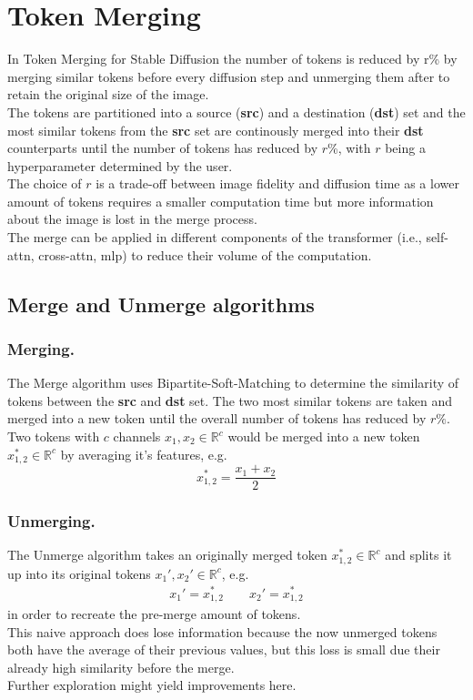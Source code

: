 \section{Token Merging}
In Token Merging for Stable Diffusion\cite{bolya2023tomesd} the number of tokens is reduced by r\% by merging similar tokens before every diffusion step and unmerging them after to retain the original size of the image.\\
The tokens are partitioned into a source (\textbf{src}) and a destination (\textbf{dst}) set and the most similar tokens from the \textbf{src} set are continously merged into their \textbf{dst} counterparts until the number of tokens has reduced by \(r\)\%, with \(r\) being a hyperparameter determined by the user.\\ 
The choice of \(r\) is a trade-off between image fidelity and diffusion time as a lower amount of tokens requires a smaller computation time but more information about the image is lost in the merge process.\\
The merge can be applied in different components of the transformer (i.e., self-attn, cross-attn, mlp) to reduce their volume of the computation. 

\subsection{Merge and Unmerge algorithms}
\subsubsection*{Merging.} The Merge algorithm uses Bipartite-Soft-Matching to determine the similarity of tokens between the \textbf{src} and \textbf{dst} set. The two most similar tokens are taken and merged into a new token until the overall number of tokens has reduced by \(r\%\).\\
Two tokens with \(c\) channels \(x_1, x_2 \in \mathbb{R}^c\) would be merged into a new token \(x_{1,2}^* \in \mathbb{R}^c \) by averaging it's features, e.g. \[x_{1,2}^* = \frac{x_1 + x_2}{2}\]

\subsubsection*{Unmerging.} The Unmerge algorithm takes an originally merged token $x_{1,2}^* \in \mathbb{R}^c$ and splits it up into its original tokens $x_1', x_2' \in \mathbb{R}^c$, e.g. 
\begin{align*}
    x_1' = x_{1,2}^* \quad\quad
    x_2' = x_{1,2}^*
\end{align*}
in order to recreate the pre-merge amount of tokens.\\
This naive approach does lose information because the now unmerged tokens both have the average of their previous values, but this loss is small due their already high similarity before the merge.\\ Further exploration might yield improvements here.

